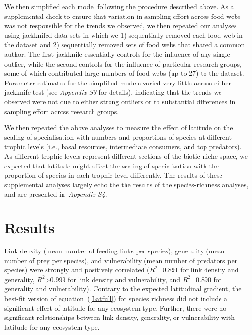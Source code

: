 \documentclass[12pt]{article}
\begin{document}
    We then simplified each model following the procedure described above.
    As a supplemental check to ensure that variation in sampling effort
    across food webs was not responsible for the trends we observed, we then
    repeated our analyses using jackknifed data sets in which we 1) sequentially
    removed each food web in the dataset and 2) sequentially removed sets of food webs
    that shared a common author. The first jackknife essentially controls for the
    influence of any single outlier, while the second controls for the influence
    of particular research groups, some of which contributed large numbers of food
    webs (up to 27) to the dataset. Parameter estimates for the simplified models 
    varied very little across either jackknife test (see \emph{Appendix S3} for details),
    indicating that the trends we observed were not due to either strong outliers or
    to substantial differences in sampling effort across research groups.


    We then repeated the above analyses to measure the 
    effect of latitude on the scaling of specialisation 
    with numbers and proportions of species at different 
    trophic levels (i.e., basal resources, intermediate 
    consumers, and top predators). As different trophic 
    levels represent different sections of the biotic niche 
    space, we expected that latitude might affect the 
    scaling of specialisation with the proportion of 
    species in each trophic level differently. The results
    of these supplemental analyses largely echo the the
    results of the species-richness analyses, and are 
    presented in~\emph{Appendix S4}.


\section*{Results}

  Link density (mean number of feeding links per species), generality (mean
  number of prey per species), and vulnerability (mean number of predators per
  species) were strongly and positively correlated ($R^2$=0.891 for link
  density and generality, $R^2$\textgreater0.999 for link density and
  vulnerability, and $R^2$=0.890 for generality and vulnerability). Contrary
  to the expected latitudinal gradient, the best-fit version of
  equation~(\ref{Latfull}) for species richness did not include a significant
  effect of latitude for any ecosystem type. Further, there were no significant
  relationships between link density, generality, or vulnerability with
  latitude for any ecosystem type.
\end{document}
